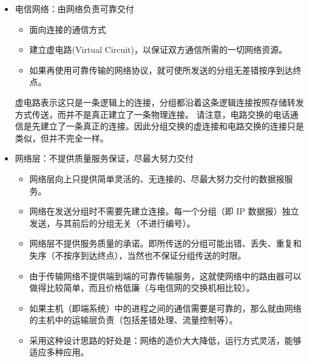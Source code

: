 \begin{itemize}
  \item 电信网络：由网络负责可靠交付

\begin{itemize}
  \item 面向连接的通信方式

  \item 建立虚电路(Virtual Circuit)，以保证双方通信所需的一切网络资源。

  \item 如果再使用可靠传输的网络协议，就可使所发送的分组无差错按序到达终点。

\end{itemize}





\begin{remark}
虚电路表示这只是一条逻辑上的连接，分组都沿着这条逻辑连接按照存储转发方式传送，而并不是真正建立了一条物理连接。
请注意，电路交换的电话通信是先建立了一条真正的连接。因此分组交换的虚连接和电路交换的连接只是类似，但并不完全一样。
\end{remark}




  \item 网络层：不提供质量服务保证，尽最大努力交付
\begin{itemize}
  \item 网络层向上只提供简单灵活的、无连接的、尽最大努力交付的数据报服务。

  \item 网络在发送分组时不需要先建立连接。每一个分组（即 IP 数据报）独立发送，与其前后的分组无关（不进行编号）。

  \item 网络层不提供服务质量的承诺。即所传送的分组可能出错、丢失、重复和失序（不按序到达终点），当然也不保证分组传送的时限。

  \item 由于传输网络不提供端到端的可靠传输服务，这就使网络中的路由器可以做得比较简单，而且价格低廉（与电信网的交换机相比较）。

  \item 如果主机（即端系统）中的进程之间的通信需要是可靠的，那么就由网络的主机中的运输层负责（包括差错处理、流量控制等）。

  \item  采用这种设计思路的好处是：网络的造价大大降低，运行方式灵活，能够适应多种应用。

\end{itemize}


\end{itemize}





